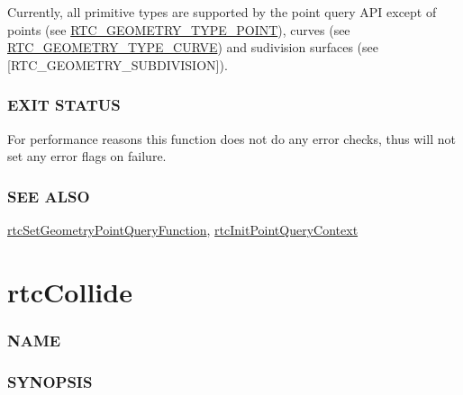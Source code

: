 Currently, all primitive types are supported by the point query API
except of points (see
\hyperref[rtc_geometry_type_point]{RTC\_GEOMETRY\_TYPE\_POINT}), curves
(see \hyperref[rtc_geometry_type_curve]{RTC\_GEOMETRY\_TYPE\_CURVE}) and
sudivision surfaces (see {[}RTC\_GEOMETRY\_SUBDIVISION{]}).

\subsubsection{EXIT STATUS}\label{exit-status}

For performance reasons this function does not do any error checks, thus
will not set any error flags on failure.

\subsubsection{SEE ALSO}\label{see-also}

\hyperref[rtcsetgeometrypointqueryfunction]{rtcSetGeometryPointQueryFunction},
\hyperref[rtcinitpointquerycontext]{rtcInitPointQueryContext}

\pagebreak

\section{rtcCollide}\label{rtccollide}

\subsubsection{NAME}\label{name}

\begin{Shaded}
\begin{Highlighting}[]
\OperatorTok{{-}}
\end{Highlighting}
\end{Shaded}

\subsubsection{SYNOPSIS}\label{synopsis}

